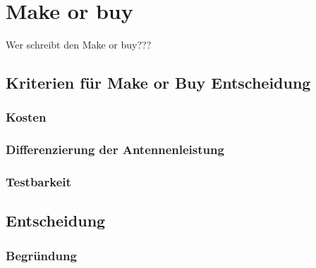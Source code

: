 
%
%
% 
% 
% 

\section{Make or buy}
\label{sec:make_buy}
Wer schreibt den Make or buy???

\subsection{Kriterien für Make or Buy Entscheidung}
\subsubsection{Kosten}
\subsubsection{Differenzierung der Antennenleistung}
\subsubsection{Testbarkeit}

\subsection{Entscheidung}
\subsubsection{Begründung}